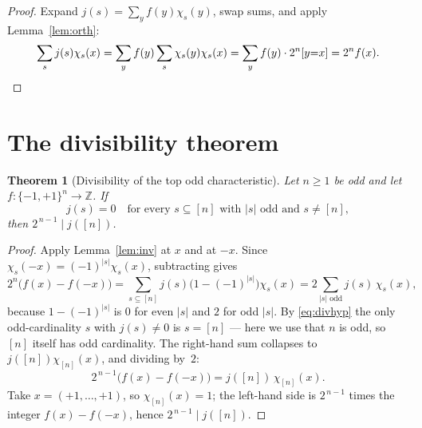 \documentclass[10pt,a4paper]{amsart}
\newtheorem{theorem}{Theorem}
\newcommand{\Fpm}{\{-1,+1\}}
\newcommand{\jc}{j}
\begin{document}
\begin{proof}
Expand $\jc(s)=\sum_y f(y)\chi_s(y)$, swap sums, and apply
Lemma~\ref{lem:orth}:
\[
\sum_s\jc(s)\chi_s(x)
=\sum_y f(y)\sum_s\chi_s(y)\chi_s(x)
=\sum_y f(y)\cdot 2^n[y{=}x]
=2^n f(x).\qedhere
\]
\end{proof}

\section{The divisibility theorem}


\begin{theorem}[Divisibility of the top odd characteristic]\label{thm:divis}
Let $n\ge 1$ be \emph{odd} and let $f:\Fpm^n\to\mathbb Z$. If
\begin{equation}\label{eq:divhyp}
  \jc(s)=0 \quad\text{for every }s\subseteq[n]\text{ with $|s|$ odd and }s\ne[n],
\end{equation}
then $2^{\,n-1}\mid \jc([n])$.
\end{theorem}

\begin{proof}
Apply Lemma~\ref{lem:inv} at $x$ and at $-x$. Since
$\chi_s(-x)=(-1)^{|s|}\chi_s(x)$, subtracting gives
\[
  2^n\bigl(f(x)-f(-x)\bigr)
   = \sum_{s\subseteq[n]} \jc(s)\bigl(1-(-1)^{|s|}\bigr)\chi_s(x)
   = 2\!\!\sum_{|s|\text{ odd}}\!\!\jc(s)\,\chi_s(x),
\]
because $1-(-1)^{|s|}$ is $0$ for even $|s|$ and $2$ for odd $|s|$. By
\eqref{eq:divhyp} the only odd-cardinality $s$ with $\jc(s)\ne 0$ is
$s=[n]$ --- here we use that $n$ is odd, so $[n]$ itself has odd cardinality.
The right-hand sum collapses to $\jc([n])\chi_{[n]}(x)$, and dividing by~$2$:
\begin{equation}\label{eq:key}
  2^{\,n-1}\bigl(f(x)-f(-x)\bigr)=\jc([n])\,\chi_{[n]}(x).
\end{equation}
Take $x=(+1,\dots,+1)$, so $\chi_{[n]}(x)=1$; the left-hand side is
$2^{\,n-1}$ times the integer $f(x)-f(-x)$, hence
$2^{\,n-1}\mid \jc([n])$.
\end{proof}
\end{document}
